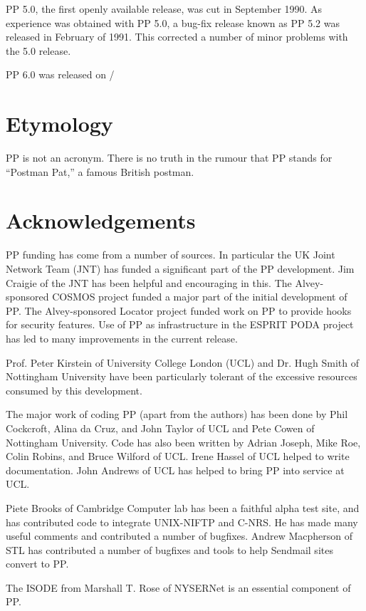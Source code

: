 PP 5.0, the first openly available release, was cut in September 1990.
As experience was obtained with PP 5.0, a bug-fix release known as PP
5.2 was released in February of 1991. This corrected a number of minor
problems with the 5.0 release. 

PP 6.0 was released on \ppdate/ 
\section {Etymology}

PP is not an acronym.  There is no truth in the rumour that PP stands
for ``Postman Pat,'' a famous British postman.

\section {Acknowledgements}

PP funding has come from a number of sources.  In particular the UK
Joint Network Team (JNT) has funded a significant part of the PP
development.  Jim Craigie of the JNT has been helpful and encouraging
in this.  The Alvey-sponsored COSMOS project funded a major part of
the initial development of PP.  The Alvey-sponsored Locator project
funded work on PP to provide hooks for security features.  Use of PP
as infrastructure in the ESPRIT PODA project has led to many
improvements in the current release.

Prof. Peter Kirstein of University College London (UCL) and Dr. Hugh
Smith of Nottingham University have been particularly tolerant of the
excessive resources consumed by this development.


The major work of coding PP (apart from the authors) has been done by
Phil Cockcroft, Alina da Cruz, and John Taylor of UCL and Pete Cowen
of Nottingham University.  Code has also been written by Adrian
Joseph, Mike Roe, Colin Robins, and Bruce Wilford of UCL.
Irene Hassel of UCL
helped to write documentation.  John Andrews of UCL has helped to
bring PP into service at UCL.

Piete Brooks of Cambridge Computer lab has been a faithful alpha test site,
and has contributed code to integrate UNIX-NIFTP and C-NRS.  He has made
many useful comments and contributed a number of bugfixes.  Andrew
Macpherson of STL has contributed a number of bugfixes and tools to help
Sendmail sites convert to PP.   

The ISODE from Marshall T. Rose of NYSERNet is an essential
component of PP.

